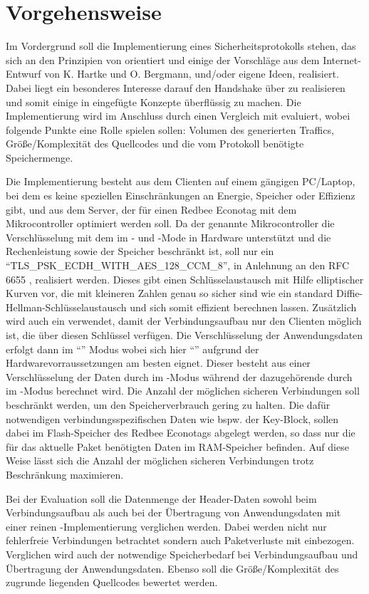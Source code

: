 \chapter{Vorgehensweise}

Im Vordergrund soll die Implementierung eines Sicherheitsprotokolls stehen, das sich an den Prinzipien von  orientiert
und einige der Vorschläge aus dem Internet-Entwurf von K. Hartke und O. Bergmann, und/oder eigene Ideen, realisiert.
Dabei liegt ein besonderes Interesse darauf den Handshake über  \cite{draftcoap13} zu realisieren und somit einige in  eingefügte
Konzepte überflüssig zu machen. Die Implementierung wird im Anschluss durch einen Vergleich mit  evaluiert, wobei folgende Punkte eine
Rolle spielen sollen: Volumen des generierten Traffics, Größe/Komplexität des Quellcodes und die vom Protokoll benötigte Speichermenge.

Die Implementierung besteht aus dem Clienten auf einem gängigen PC/Laptop, bei dem es keine speziellen Einschränkungen an Energie,
Speicher oder Effizienz gibt, und aus dem Server, der für einen Redbee Econotag \cite{econotag} mit dem 
Mikrocontroller \cite{mc1322} optimiert werden soll. Da der genannte Mikrocontroller die Verschlüsselung mit dem  im - und -Mode
in Hardware unterstützt und die Rechenleistung sowie der Speicher beschränkt ist, soll nur ein  "`TLS\_PSK\_ECDH\_WITH\_AES\_128\_CCM\_8"',
in Anlehnung an den RFC 6655 \cite{rfc6655}, realisiert werden. Dieses gibt einen Schlüsselaustausch mit
Hilfe elliptischer Kurven vor, die mit kleineren Zahlen genau so sicher sind wie ein standard Diffie-Hellman-Schlüsselaustausch und sich somit
effizient berechnen lassen. Zusätzlich wird auch ein  verwendet, damit der Verbindungsaufbau nur den Clienten möglich ist, die über diesen
Schlüssel verfügen. Die Verschlüsselung der Anwendungsdaten erfolgt dann im "`"' Modus \cite{rfc5116}
wobei sich hier "`"' \cite{rfc3610} aufgrund der Hardwarevorraussetzungen am besten eignet. Dieser besteht
aus einer Verschlüsselung der Daten durch  im -Modus während der dazugehörende  durch  im -Modus berechnet wird.
Die Anzahl der möglichen sicheren Verbindungen soll beschränkt werden, um den Speicherverbrauch gering zu halten.
Die dafür notwendigen verbindungsspezifischen Daten wie bspw. der Key-Block, sollen dabei im Flash-Speicher des Redbee Econotags
abgelegt werden, so dass nur die für das aktuelle Paket benötigten Daten im RAM-Speicher befinden. Auf diese Weise lässt sich
die Anzahl der möglichen sicheren Verbindungen trotz Beschränkung maximieren.

Bei der Evaluation soll die Datenmenge der Header-Daten sowohl beim Verbindungsaufbau als auch bei der Übertragung von Anwendungsdaten
mit einer reinen -Implementierung verglichen werden. Dabei werden nicht nur fehlerfreie Verbindungen betrachtet sondern auch Paketverluste
mit einbezogen. Verglichen wird auch der notwendige Speicherbedarf bei Verbindungsaufbau und Übertragung der Anwendungsdaten.
Ebenso soll die Größe/Komplexität des zugrunde liegenden Quellcodes bewertet werden.